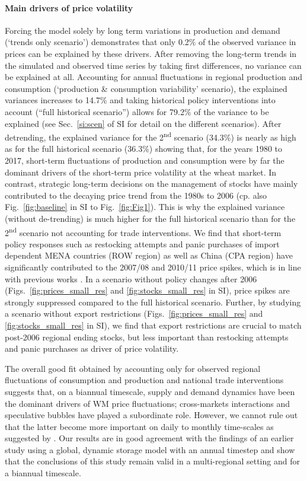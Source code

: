\documentclass[12pt]{article}
\begin{document}
\paragraph{Main drivers of price volatility}
Forcing the model solely by long term variations in production and demand (`trends only scenario')  demonstrates that only 0.2\% of the observed variance in prices can be explained by these drivers. After removing the long-term trends in the simulated and observed time series by taking first differences, no variance can be explained at all. Accounting for annual fluctuations in regional production and consumption (`production \& consumption variability' scenario), the explained variances increases to 14.7\% and taking historical policy interventions into account (“full historical scenario”) allows for 79.2\% of the variance to be explained (see Sec.~\ref{si:scen} of SI for detail on the different scenarios). After detrending, the explained variance for the 2\textsuperscript{nd} scenario (34.3\%) is nearly as high as for the full historical scenario (36.3\%) showing that, for the years 1980 to 2017, short-term fluctuations of production and consumption were by far the dominant drivers of the short-term price volatility at the wheat market. In contrast, strategic long-term decisions on the management of stocks have mainly contributed to the decaying price trend from the 1980s to 2006 (cp. also Fig.~\ref{fig:baseline} in SI to Fig.~\ref{fig:Fig1}). This is why the explained variance (without de-trending) is much higher for the full historical scenario than for the 2\textsuperscript{nd} scenario not accounting for trade interventions. We find that short-term policy responses such as restocking attempts and panic purchases of import dependent MENA countries (ROW region) as well as China (CPA region) have significantly contributed to the 2007/08 and 2010/11 price spikes, which is in line with previous works \cite{HEA08,TRO11,HEA10}. In a scenario without policy changes after 2006 (Figs.~\ref{fig:prices_small_res} and \ref{fig:stocks_small_res} in SI), price spikes are strongly suppressed compared to the full historical scenario. Further, by studying a scenario without export restrictions (Figs.~\ref{fig:prices_small_res} and \ref{fig:stocks_small_res} in SI), we find that export restrictions are crucial to match post-2006 regional ending stocks, but less important than restocking attempts and panic purchases as driver of price volatility.

The overall good fit obtained by accounting only for observed regional fluctuations of consumption
and production and national trade interventions suggests that, on a biannual timescale, supply and
demand dynamics have been the dominant drivers of WM price fluctuations; cross-markets
interactions and speculative bubbles have played a subordinate role. However, we cannot rule out
that the latter become more important on daily to monthly time-scales as suggested by
\cite{LAG15}. Our results are in good agreement with the findings of an earlier study using a global,
dynamic storage model with an annual timestep \cite{SCH17} and show that the conclusions of this
study remain valid in a multi-regional setting and for a biannual timescale.
\end{document}
